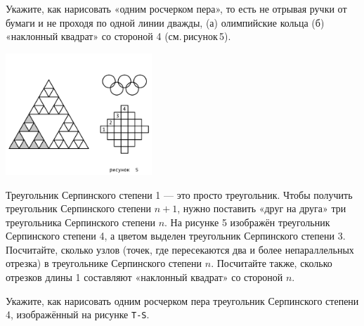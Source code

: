﻿

\begin{enumerate}
\itA Укажите, как нарисовать «одним росчерком пера», то есть не отрывая ручки от бумаги и не проходя по одной линии дважды, (а) олимпийские кольца (б) «наклонный квадрат» со стороной 4 (см.\,рисунок\,5).

\centerline{\includegraphics[width=5.5cm]{stats/2018/images/serpinsky}}

\itB Треугольник Серпинского степени 1 — это просто треугольник. Чтобы получить треугольник Серпинского степени $n+1$, нужно поставить «друг на друга» три треугольника Серпинского степени $n$. На рисунке 5 изображён треугольник Серпинского степени 4, а цветом выделен треугольник Серпинского степени 3. Посчитайте, сколько узлов (точек, где пересекаются два и более непараллельных отрезка) в треугольнике Серпинского степени $n$. Посчитайте также, сколько отрезков длины 1 составляют «наклонный квадрат» со стороной $n$.

\itC Укажите, как нарисовать одним росчерком пера треугольник Серпинского степени 4, изображённый на рисунке {\tt T-S}.
\end{enumerate}